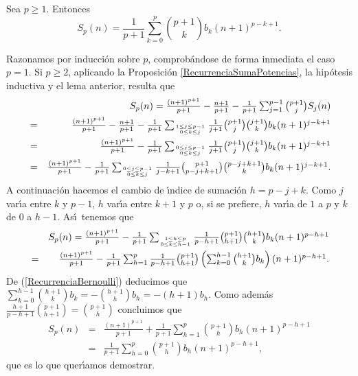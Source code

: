 \begin{teorema} Sea $p\geq 1$. Entonces
\begin{equation}\label{FormulaSumaPotencias} S_p(n)=\frac{1}{p+1}\sum_{k=0}^p{p+1\choose k}b_k(n+1)^{p-k+1}.\end{equation}
\end{teorema}

\begin{demostracion}
Razonamos por inducci\'on sobre $p$, comprob\'andose de forma inmediata el caso $p=1$. Si $p\geq 2$, aplicando la Proposici\'on \ref{RecurrenciaSumaPotencias}, la hip\'otesis inductiva y el lema anterior, resulta que
\begin{eqnarray*}
&&\textstyle S_p(n)=\frac{(n+1)^{p+1}}{p+1}-\frac{n+1}{p+1}-\frac{1}{p+1}\sum_{j=1}^{p-1}{p+1\choose j}S_j(n)\\
&=&\textstyle \frac{(n+1)^{p+1}}{p+1}-\frac{n+1}{p+1}-\frac{1}{p+1}\sum_{1\leq j\leq p-1\atop 0\leq k\leq j}\frac{1}{j+1}{p+1\choose j}{j+1\choose k}b_k(n+1)^{j-k+1}\\
&=&\textstyle \frac{(n+1)^{p+1}}{p+1}-\frac{1}{p+1}\sum_{0\leq j\leq p-1\atop 0\leq k\leq j}\frac{1}{j+1}{p+1\choose j}{j+1\choose k}b_k(n+1)^{j-k+1}\\
&=&\textstyle \frac{(n+1)^{p+1}}{p+1}-\frac{1}{p+1}\sum_{0\leq j\leq p-1\atop 0\leq k\leq j}\frac{1}{j-k+1}{p+1\choose p-j+k+1}{p-j+k+1\choose k}b_k(n+1)^{j-k+1}.
\end{eqnarray*}
A continuaci\'on hacemos el cambio de \'\i ndice de sumaci\'on $h=p-j+k$. Como $j$ var\'\i a entre $k$ y $p-1$, $h$ var\'\i a entre $k+1$ y $p$ o, si se prefiere, $h$ var\'\i a de $1$ a $p$ y $k$ de $0$ a $h-1$. As\'\i\ tenemos que
\begin{eqnarray*}
&&\textstyle S_p(n)=\frac{(n+1)^{p+1}}{p+1}-\frac{1}{p+1}\sum_{1\leq h\leq p\atop 0\leq k\leq h-1}\frac{1}{p-h+1}{p+1\choose h+1}{h+1\choose k}b_k(n+1)^{p-h+1}\\
&=&\textstyle  \frac{(n+1)^{p+1}}{p+1}-\frac{1}{p+1}\sum_{h=1}^p\frac{1}{p-h+1}{p+1\choose h+1}\left(\sum_{k=0}^{h-1}{h+1\choose k}b_k\right) (n+1)^{p-h+1}.
\end{eqnarray*}
De (\ref{RecurrenciaBernoulli}) deducimos que $\sum_{k=0}^{h-1}{h+1\choose k}b_k=-{h+1\choose h}b_h=-(h+1)b_h$. Como adem\'as $\frac{h+1}{p-h+1}{p+1\choose h+1}={p+1\choose h}$ concluimos que
\begin{eqnarray*}S_p(n)&=& \frac{(n+1)^{p+1}}{p+1}+\frac{1}{p+1}\sum_{h=1}^p{p+1\choose h}b_h(n+1)^{p-h+1}\\&=&
\frac{1}{p+1}\sum_{h=0}^p{p+1\choose h}b_h(n+1)^{p-h+1},\end{eqnarray*}
que es lo que quer\'\i amos demostrar.
\end{demostracion}

